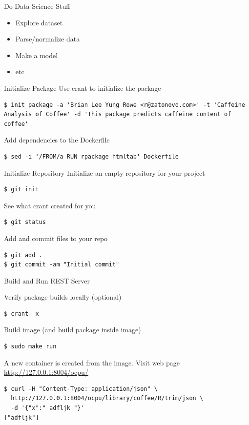 \documentclass{beamer}
\begin{document}
\begin{frame}{Do Data Science Stuff}
\begin{itemize}
\item Explore dataset
\item Parse/normalize data
\item Make a model
\item etc
\end{itemize}
\end{frame}


\begin{frame}[fragile]{Initialize Package}
Use crant to initialize the package
\begin{lstlisting}
$ init_package -a 'Brian Lee Yung Rowe <r@zatonovo.com>' -t 'Caffeine Analysis of Coffee' -d 'This package predicts caffeine content of coffee'
\end{lstlisting}

Add dependencies to the Dockerfile
\begin{lstlisting}
$ sed -i '/FROM/a RUN rpackage htmltab' Dockerfile
\end{lstlisting}

\end{frame}


\begin{frame}[fragile]{Initialize Repository}
Initialize an empty repository for your project
\begin{lstlisting}
$ git init
\end{lstlisting}

See what crant created for you
\begin{lstlisting}
$ git status
\end{lstlisting}

Add and commit files to your repo
\begin{lstlisting}
$ git add .
$ git commit -am "Initial commit"
\end{lstlisting}
\end{frame}


\begin{frame}[fragile]{Build and Run REST Server}

Verify package builds locally (optional)
\begin{lstlisting}
$ crant -x
\end{lstlisting}

Build image (and build package inside image)
\begin{lstlisting}
$ sudo make run
\end{lstlisting}

A new container is created from the image.
Visit web page \href{http://127.0.0.1:8004/ocpu/}{http://127.0.0.1:8004/ocpu/}

\begin{lstlisting}
$ curl -H "Content-Type: application/json" \
  http://127.0.0.1:8004/ocpu/library/coffee/R/trim/json \
  -d '{"x":" adfljk "}'
["adfljk"]
\end{lstlisting}
\end{frame}
\end{document}
